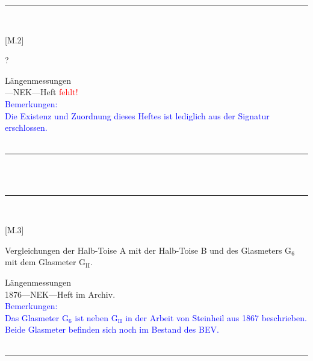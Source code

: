 \parbox{\textwidth}{%
\rule{\textwidth}{1pt}\vspace*{-3mm}\\
\begin{minipage}[t]{0.2\textwidth}\vspace{0pt}
\Huge\rule[-4mm]{0cm}{1cm}[M.2]
\end{minipage}
\hfill
\begin{minipage}[t]{0.8\textwidth}\vspace{0pt}
\large ?\rule[-2mm]{0mm}{2mm}
\end{minipage}
{\footnotesize\flushright
Längenmessungen\\
}
\quad---\quad NEK\quad---\quad Heft \textcolor{red}{fehlt!}\\
\textcolor{blue}{Bemerkungen:\\{}
Die Existenz und Zuordnung dieses Heftes ist lediglich aus der Signatur erschlossen.\\{}
}
\\[-15pt]
\rule{\textwidth}{1pt}
}
\\
\vspace*{-2.5pt}\\
\parbox{\textwidth}{%
\rule{\textwidth}{1pt}\vspace*{-3mm}\\
\begin{minipage}[t]{0.2\textwidth}\vspace{0pt}
\Huge\rule[-4mm]{0cm}{1cm}[M.3]
\end{minipage}
\hfill
\begin{minipage}[t]{0.8\textwidth}\vspace{0pt}
\large Vergleichungen der Halb-Toise {\glqq}A{\grqq} mit der Halb-Toise {\glqq}B{\grqq} und des Glasmeters {\glqq}G$_\mathrm{6}${\grqq} mit dem Glasmeter {\glqq}G$_\mathrm{II}${\grqq}.\rule[-2mm]{0mm}{2mm}
\end{minipage}
{\footnotesize\flushright
Längenmessungen\\
}
1876\quad---\quad NEK\quad---\quad Heft im Archiv.\\
\textcolor{blue}{Bemerkungen:\\{}
Das Glasmeter G$_\mathrm{6}$ ist neben G$_\mathrm{II}$ in der Arbeit von Steinheil aus 1867 beschrieben.\\{}
Beide Glasmeter befinden sich noch im Bestand des BEV.\\{}
}
\\[-15pt]
\rule{\textwidth}{1pt}
}
\\
